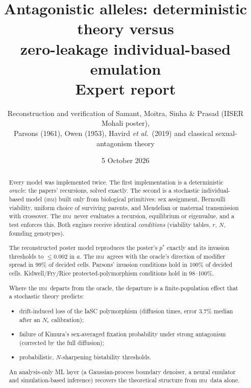 \documentclass[11pt,a4paper]{article}
\title{\textbf{Antagonistic alleles: deterministic theory versus\\ zero-leakage individual-based emulation}\\[4pt]
\large Expert report}
\author{Reconstruction and verification of Samant, Moitra, Sinha \& Prasad (IISER Mohali poster),\\
Parsons (1961), Owen (1953), Havird \emph{et al.}\ (2019) and classical sexual-antagonism theory}
\date{5 October 2026}
\newcommand{\IBM}{\textsc{ibm}}
\newcommand{\pstar}{p^{*}}
\begin{document}
\maketitle

\begin{abstract}
Every model was implemented twice. The first implementation is a deterministic \emph{oracle}: the papers' recursions, solved exactly. The second is a stochastic individual-based model (\IBM) built only from biological primitives: sex assignment, Bernoulli viability, uniform choice of surviving parents, and Mendelian or maternal transmission with crossover. The \IBM\ never evaluates a recursion, equilibrium or eigenvalue, and a test enforces this. Both engines receive identical \emph{conditions} (viability tables, $r$, $N$, founding genotypes).

The reconstructed poster model reproduces the poster's $\pstar$ exactly and its invasion thresholds to $\le 0.002$ in $a$. The \IBM\ agrees with the oracle's direction of modifier spread in 99\% of decided cells. Parsons' invasion conditions hold in 100\% of decided cells. Kidwell/Fry/Rice protected-polymorphism conditions hold in 98--100\%.

Where the \IBM\ departs from the oracle, the departure is a finite-population effect that a stochastic theory predicts:
\begin{itemize}
\item drift-induced loss of the IaSC polymorphism (diffusion times, error 3.7\% median after an $N_e$ calibration);
\item failure of Kimura's sex-averaged fixation probability under strong antagonism (corrected by the full diffusion);
\item probabilistic, $N$-sharpening bistability thresholds.
\end{itemize}
An analysis-only ML layer (a Gaussian-process boundary denoiser, a neural emulator and simulation-based inference) recovers the theoretical structure from \IBM\ data alone.
\end{abstract}

\tableofcontents
\newpage

\end{document}
